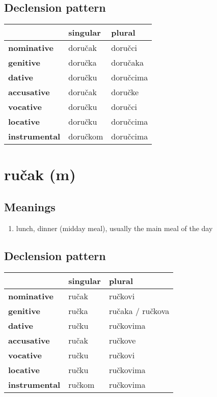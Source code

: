 \subsection*{Declension pattern}
\begin{tabularx}{\linewidth}{Xll}
\toprule
{} &  singular &     plural \\
\midrule
\textbf{nominative  } &   doručak &    doručci \\
\textbf{genitive    } &   doručka &   doručaka \\
\textbf{dative      } &   doručku &  doručcima \\
\textbf{accusative  } &   doručak &    doručke \\
\textbf{vocative    } &   doručku &    doručci \\
\textbf{locative    } &   doručku &  doručcima \\
\textbf{instrumental} &  doručkom &  doručcima \\
\bottomrule
\end{tabularx}

\filbreak
\section{ručak (m)}
\subsection*{Meanings}
\begin{enumerate}
\item lunch, dinner (midday meal), usually the main meal of the day
\end{enumerate}
\subsection*{Declension pattern}
\begin{tabularx}{\linewidth}{Xll}
\toprule
{} & singular &            plural \\
\midrule
\textbf{nominative  } &    ručak &           ručkovi \\
\textbf{genitive    } &    ručka &  ručaka / ručkova \\
\textbf{dative      } &    ručku &         ručkovima \\
\textbf{accusative  } &    ručak &           ručkove \\
\textbf{vocative    } &    ručku &           ručkovi \\
\textbf{locative    } &    ručku &         ručkovima \\
\textbf{instrumental} &   ručkom &         ručkovima \\
\bottomrule
\end{tabularx}

